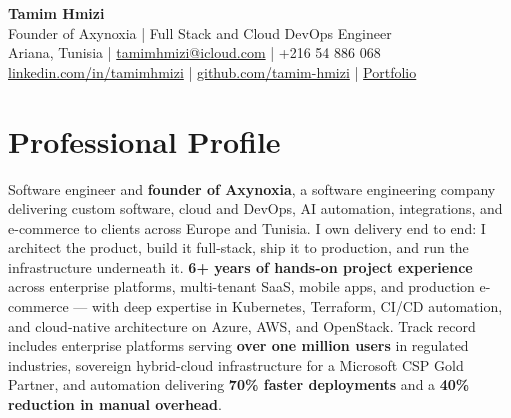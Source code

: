 \documentclass[10pt, letterpaper]{article}
\begin{document}
{\fontsize{22}{22}\selectfont \textbf{Tamim Hmizi}} \\[4pt]
{\large Founder of Axynoxia \;|\; Full Stack and Cloud DevOps Engineer} \\[6pt]
Ariana, Tunisia \;|\;
\href{mailto:tamimhmizi@icloud.com}{tamimhmizi@icloud.com} \;|\;
+216 54 886 068 \\
\href{https://linkedin.com/in/tamimhmizi}{linkedin.com/in/tamimhmizi} \;|\;
\href{https://github.com/tamim-hmizi}{github.com/tamim-hmizi} \;|\;
\href{https://tamim-hmizi.github.io/Portfolio/}{Portfolio}

\vspace{0.4cm}

\section{Professional Profile}
Software engineer and \textbf{founder of Axynoxia}, a software engineering company delivering custom software, cloud and DevOps, AI automation, integrations, and e-commerce to clients across Europe and Tunisia.
I own delivery end to end: I architect the product, build it full-stack, ship it to production, and run the infrastructure underneath it.
\textbf{6+ years of hands-on project experience} across enterprise platforms, multi-tenant SaaS, mobile apps, and production e-commerce --- with deep expertise in Kubernetes, Terraform, CI/CD automation, and cloud-native architecture on Azure, AWS, and OpenStack.
Track record includes enterprise platforms serving \textbf{over one million users} in regulated industries, sovereign hybrid-cloud infrastructure for a Microsoft CSP Gold Partner, and automation delivering \textbf{70\% faster deployments} and a \textbf{40\% reduction in manual overhead}.

\end{document}
